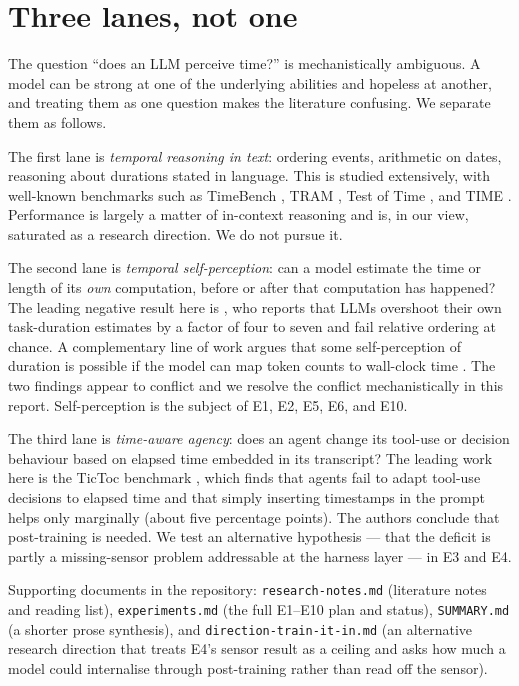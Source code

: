 \documentclass[11pt]{article}
\newcommand{\code}[1]{\texttt{\small #1}}
\begin{document}
\tableofcontents

\section{Three lanes, not one}
\label{sec:scope}

The question ``does an LLM perceive time?'' is mechanistically ambiguous. A model can be strong
at one of the underlying abilities and hopeless at another, and treating them as one question
makes the literature confusing. We separate them as follows.

The first lane is \emph{temporal reasoning in text}: ordering events, arithmetic on dates,
reasoning about durations stated in language. This is studied extensively, with well-known
benchmarks such as TimeBench \citep{chu2024timebench}, TRAM \citep{wang2024tram}, Test of Time
\citep{fatemi2025testoftime}, and TIME \citep{wei2025time}. Performance is largely a matter of
in-context reasoning and is, in our view, saturated as a research direction. We do not pursue it.

The second lane is \emph{temporal self-perception}: can a model estimate the time or length of
its \emph{own} computation, before or after that computation has happened? The leading negative
result here is \citet{garikaparthi2026time}, who reports that LLMs overshoot their own
task-duration estimates by a factor of four to seven and fail relative ordering at chance.
A complementary line of work argues that some self-perception of duration is possible if the
model can map token counts to wall-clock time \citep{wang2025discrete}. The two findings appear
to conflict and we resolve the conflict mechanistically in this report. Self-perception is the
subject of E1, E2, E5, E6, and E10.

The third lane is \emph{time-aware agency}: does an agent change its tool-use or decision
behaviour based on elapsed time embedded in its transcript? The leading work here is the
TicToc benchmark \citep{cheng2025temporally}, which finds that agents fail to adapt tool-use
decisions to elapsed time and that simply inserting timestamps in the prompt helps only
marginally (about five percentage points). The authors conclude that post-training is needed.
We test an alternative hypothesis --- that the deficit is partly a missing-sensor problem
addressable at the harness layer --- in E3 and E4.

Supporting documents in the repository: \code{research-notes.md} (literature notes and reading
list), \code{experiments.md} (the full E1--E10 plan and status), \code{SUMMARY.md} (a shorter
prose synthesis), and \code{direction-train-it-in.md} (an alternative research direction that
treats E4's sensor result as a ceiling and asks how much a model could internalise through
post-training rather than read off the sensor).
\end{document}
